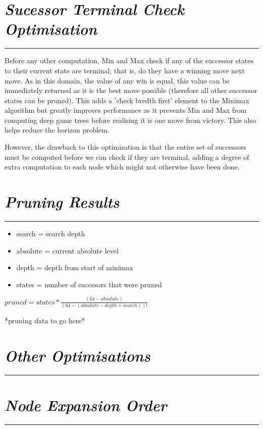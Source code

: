 \documentclass[10pt]{report}
\begin{document}
\begin{multicols}{2}
\section*{\emph{\textmd{Sucessor Terminal Check Optimisation}}}
\hrule
\vspace{0.4cm}

Before any other computation, Min and Max check if any of the successor states to their current state are terminal; that is, do they have a winning move next move. As in this domain, the value of any win is equal, this value can be immediately returned as it is the best move possible (therefore all other successor states can be pruned). This adds a 'check bredth first' element to the Minimax algorithm but greatly improves performance as it prevents Min and Max from computing deep game trees before realising it is one move from victory. This also helps reduce the horizon problem.

However, the drawback to this optimisation is that the entire set of successors must be computed before we can check if they are terminal, adding a degree of extra computation to each node which might not otherwise have been done.

\section*{\emph{\textmd{Pruning Results}}}
\hrule
\vspace{0.4cm}

\begin{itemize}
\item search = search depth
\item absolute = current absolute level
\item depth = depth from start of minimax
\item states = number of succesors that were pruned
\end{itemize}

$pruned = states * \frac{(64 - absolute)}{(64 - (absolute - depth + search))!}$

*pruning data to go here*

\section*{\emph{{Other Optimisations}}}
\hrule
\vspace{0.4cm}

\section*{\emph{\textmd{Node Expansion Order}}}
\hrule
\vspace{0.4cm}


\end{multicols}
\end{document}
